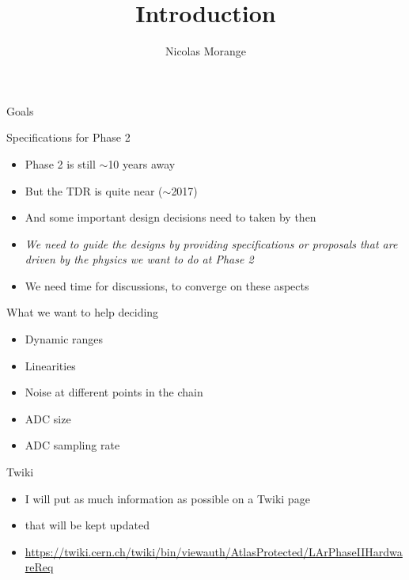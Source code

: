 \documentclass[8pt]{beamer}
\title{Introduction}
\author[N. Morange]{Nicolas Morange}
\institute[LAL Orsay]{}
\begin{document}
\maketitle
\small


\begin{frame}{Goals}
  \begin{block}{Specifications for Phase 2}
    \begin{itemize}
      \item Phase 2 is still $\sim$10 years away
      \item But the TDR is quite near ($\sim$2017)
      \item And some important design decisions need to taken by then
      \item \emph{We need to guide the designs by providing specifications or proposals that are driven by the physics we want to do at Phase 2}
      \item We need time for discussions, to converge on these aspects
    \end{itemize}
  \end{block}

  \begin{block}{What we want to help deciding}
    \begin{itemize}
      \item Dynamic ranges
      \item Linearities
      \item Noise at different points in the chain
      \item ADC size
      \item ADC sampling rate
    \end{itemize}
  \end{block}

  \begin{block}{Twiki}
    \begin{itemize}
      \item I will put as much information as possible on a Twiki page
      \item that will be kept updated
      \item \url{https://twiki.cern.ch/twiki/bin/viewauth/AtlasProtected/LArPhaseIIHardwareReq}
    \end{itemize}
  \end{block}
\end{frame}
\end{document}
